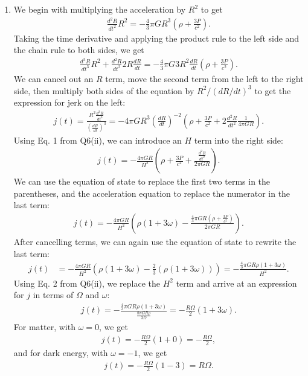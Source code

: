\documentclass[11pt,letterpaper]{article}
\begin{document}
\begin{enumerate}[label=(\roman*)]
    \item We begin with multiplying the acceleration by $R^2$ to get 
        \begin{align*}
            \frac{d^2R}{dt^2}R^2 = -\frac{4}{3}\pi GR^3(\rho + \frac{3P}{c^2}).
        \end{align*}
        Taking the time derivative and applying the product rule to the left side and the chain rule to both sides, we get 
        \begin{align*}
            \frac{d^3R}{dt^3}R^2 + \frac{d^2R}{dt^2}2R\frac{dR}{dt} = -\frac{4}{3}\pi G3R^2\frac{dR}{dt}(\rho + \frac{3P}{c^2}).
        \end{align*}
        We can cancel out an $R$ term, move the second term from the left to the right side, then multiply both sides of the equation by $R^2/(dR/dt)^3$ to get the expression for jerk on the left:
        \begin{align*}
            j(t) = \frac{R^2\frac{d^3R}{dt^3}}{(\frac{dR}{dt})^3} = -4\pi GR^3\left(\frac{dR}{dt}\right)^{-2}\left(\rho + \frac{3P}{c^2} + 2\frac{d^2R}{dt^2}\frac{1}{4\pi GR}\right).
        \end{align*}
        Using Eq. 1 from Q6(ii), we can introduce an $H$ term into the right side:
        \begin{align*}
            j(t) = -\frac{4\pi GR}{H^2}\left(\rho + \frac{3P}{c^2} + \frac{\frac{d^2R}{dt^2}}{2\pi GR}\right).
        \end{align*}
        We can use the equation of state to replace the first two terms in the parentheses, and the acceleration equation to replace the numerator in the last term: 
        \begin{align*}
            j(t) = -\frac{4\pi GR}{H^2}\left(\rho(1+3\omega) - \frac{\frac{4}{3}\pi GR(\rho + \frac{3P}{c^2})}{2\pi GR}\right).
        \end{align*}
        After cancelling terms, we can again use the equation of state to rewrite the last term:
        \begin{align*}
            j(t) &= -\frac{4\pi GR}{H^2}\left(\rho(1+3\omega) - \frac{2}{3}(\rho(1+3\omega))\right) = -\frac{\frac{4}{3}\pi GR\rho(1+3\omega)}{H^2}.
        \end{align*}
        Using Eq. 2 from Q6(ii), we replace the $H^2$ term and arrive at an expression for $j$ in terms of $\Omega$ and $\omega$:
        \begin{align*}
            j(t) = -\frac{\frac{4}{3}\pi GR\rho(1+3\omega)}{\frac{8\pi GR\rho}{3\Omega}} = -\frac{R\Omega}{2}(1+3\omega).
        \end{align*}
        For matter, with $\omega=0$, we get 
        \begin{align*}
            j(t) = -\frac{R\Omega}{2}(1+0) = -\frac{R\Omega}{2},
        \end{align*}
        and for dark energy, with $\omega=-1$, we get 
        \begin{align*}
            j(t) = -\frac{R\Omega}{2}(1-3) = R\Omega.
        \end{align*}

\end{enumerate}
\end{document}
